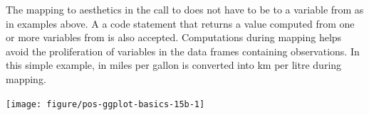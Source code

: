 \documentclass[krantz2]{krantz}\usepackage{knitr}
\begin{document}
The mapping to aesthetics in the call to  does not have to be to a variable from  as in examples above. A a code statement that returns a value computed from one or more variables from  is also accepted. Computations during mapping helps avoid the proliferation of variables in the data frames containing observations. In this simple example,  in miles per gallon is converted into km per litre during mapping.

\begin{knitrout}\footnotesize
{}\color{fgcolor}\begin{kframe}
\begin{alltt}
\hlstd{(} 
        \hlstd{=}\hlstd{(}    \hlopt{*} \hlstd{))} \hlopt{+}
  \hlstd{()}
\end{alltt}
\end{kframe}

{\centering \texttt{[image: figure/pos-ggplot-basics-15b-1]} 

}


\end{knitrout}
\end{document}
